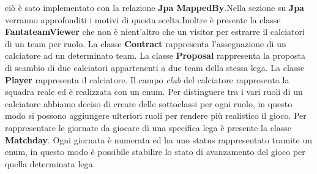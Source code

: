 ciò è sato implementato con la relazione \textbf{Jpa MappedBy}.Nella sezione su \textbf{Jpa}
verranno approfonditi i motivi di questa scelta.Inoltre è presente la classe \textbf{FantateamViewer}
che non è nient'altro che un visitor per estrarre il calciatori di un team per ruolo. La classe \textbf{Contract} rappresenta l'assegnazione di un
calciatore ad un determinato team. La classe \textbf{Proposal} rappresenta la proposta di scambio
di due calciatori appartenenti a due team della stessa lega. La classe \textbf{Player} rappresenta il calciatore. Il
campo \textit{club} del calciatore rappresenta la squadra reale ed è realizzata con un enum.
Per distinguere tra i vari ruoli di un calciatore abbiamo deciso di creare delle sottoclassi per ogni ruolo,
in questo modo si possono aggiungere ulteriori ruoli per rendere più realistico il gioco.
Per rappresentare le giornate da giocare di una specifica lega è presente la classe \textbf{Matchday}. Ogni giornata è numerata
ed ha uno status rappresentato tramite un enum, in questo modo è possibile stabilire lo stato di avanzamento del gioco
per quella determinata lega.

